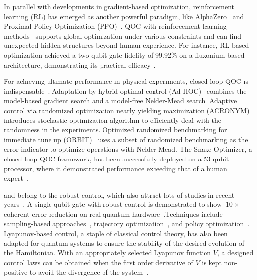 \documentclass[a4paper,onecolumn,11pt,unpublished]{quantumarticle}
\begin{document}
In parallel with developments in gradient-based optimization, reinforcement learning (RL) has emerged as another powerful paradigm, like AlphaZero~\cite{Silver2018A} and Proximal Policy Optimization (PPO)~\cite{Schulman2017Proximal}. QOC with reinforcement learning methods~\cite{Niu2019Universal,Zhang2019When,Dalgaard2019Global,Bukov2018Reinforcement,An2019Deep,Wang2020Deep,Sivak2022ModelFree} supports global optimization under various constraints and can find unexpected hidden structures beyond human experience. For instance, RL-based optimization achieved a two-qubit gate fidelity of 99.92\% on a fluxonium-based architecture, demonstrating its practical efficacy~\cite{Ding2023HighFidelity}.

For achieving ultimate performance in physical experiments, closed-loop QOC is indispensable~\cite{Feng2018Gradientbased,Li2017Hybrid,Wittler2021Integrated}. Adaptation by hybrid optimal control (Ad-HOC)~\cite{Egger2014Adaptive} combines the model-based gradient search and a model-free Nelder-Mead search. Adaptive control via randomized optimization nearly yielding maximization (ACRONYM)~\cite{Ferrie2015Robust} introduces stochastic optimization algorithm to efficiently deal with the randomness in the experiments. Optimized randomized benchmarking for immediate tune up (ORBIT)~\cite{Kelly2014Optimal} uses a subset of randomized benchmarking as the error indicator to optimize operations with Nelder-Mead. The Snake Optimizer, a closed-loop QOC framework, has been successfully deployed on a 53-qubit processor, where it demonstrated performance exceeding that of a human expert~\cite{Kelly2018Physical,Klimov2020The}.

 and  belong to the robust control, which also attract lots of studies in recent years~\cite{Zhang2014Robust,Chen2014Samplingbased,Liu2024Robust,Kosut2013Robust,Allen2020Robust,Harutyunyan2023Digital,Yi2024Robust,Cao2024Robust,Chen2025Robust,Carvalho2021ErrorRobust,Weidner2025Robust,Poggi2024Universally,Chen2013ClosedLoop}. A single qubit gate with robust control is demonstrated to show $~10\times$ coherent error reduction on real quantum hardware~\cite{Carvalho2021ErrorRobust}.Techniques include sampling-based approaches~\cite{Khaneja2005Optimal}, trajectory optimization~\cite{Propson2022Robust}, and policy optimization~\cite{Howell2023Direct}. 
Lyapunov-based control, a staple of classical control theory, has also been adapted for quantum systems to ensure the stability of the desired evolution of the Hamiltonian. With an appropriately selected Lyapunov function $V$, a designed control laws can be obtained when the first order derivative of $V$ is kept non-positive to avoid the divergence of the system~\cite{Grivopoulos2003Lyapunovbased,Mirrahimi2005Lyapunov,Cong2007Quantum,Grivopoulos2008Optimal,Kuang2008Lyapunov,Hou2012Optimal,Hou2014Realization,Kuang2017Rapid,Li2022Lyapunovbased,Cong2020Lyapunovbased,Silva2024On}.
\end{document}
